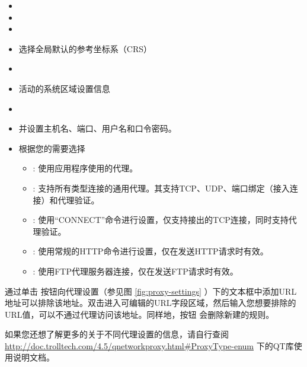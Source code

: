 
\begin{itemize}
\item {}
\item {}
\item {}
\item 选择全局默认的参考坐标系（CRS）
\end{itemize}


\begin{itemize}
\item {}
\item 活动的系统区域设置信息
\end{itemize}


\begin{itemize}
\item {}
\item {} 并设置主机名、端口、用户名和口令密码。
\item 根据您的需要选择 
 \begin{itemize}
  \item {}: 使用应用程序使用的代理。
  \item {}: 支持所有类型连接的通用代理。其支持TCP、UDP、端口绑定（接入连接）和代理验证。
  \item {}: 使用“CONNECT”命令进行设置，仅支持接出的TCP连接，同时支持代理验证。
  \item {}: 使用常规的HTTP命令进行设置，仅在发送HTTP请求时有效。
  \item {}: 使用FTP代理服务器连接，仅在发送FTP请求时有效。
 \end{itemize}
\end{itemize}

通过单击  按钮向代理设置（参见图 \ref{fig:proxy-settings} ）下的文本框中添加URL地址可以排除该地址。双击进入可编辑的URL字段区域，然后输入您想要排除的URL值，可以不通过代理访问该地址。同样地，按钮  会删除新建的规则。

如果您还想了解更多的关于不同代理设置的信息，请自行查阅 \url{http://doc.trolltech.com/4.5/qnetworkproxy.html#ProxyType-enum} 下的QT库使用说明文档。

